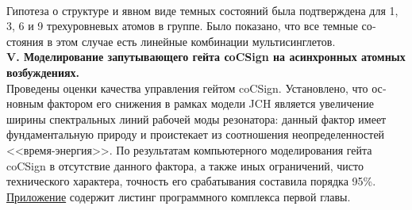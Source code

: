 \\[18pt]
Гипотеза о структуре и явном виде темных состояний была подтверждена для 1, 3, 6 и 9 трехуровневых атомов в группе. Было показано, что все темные со­стояния в этом случае есть линейные комбинации мультисинглетов.
\\[24pt]
\noindent\textbf{V. Моделирование запутывающего гейта сoCSign на асинхронных атомных возбуждениях.}
\\[18pt]
\noindent Проведены оценки качества управления гейтом coCSign. Установлено, что ос­новным фактором его снижения в рамках модели JCH является увеличение ширины спектральных линий рабочей моды резонатора: данный фактор имеет фундаментальную природу и проистекает из соотношения неопределенностей <<время-энергия>>. По результатам компьютерного моделирования гейта coCSign в отсутствие данного фактора, а также иных ограничений, чисто технического характера, точность его срабатывания составила порядка 95\%.
\\[24pt]
\hyperref[appendix]{Приложение} содержит листинг программного комплекса первой главы.
